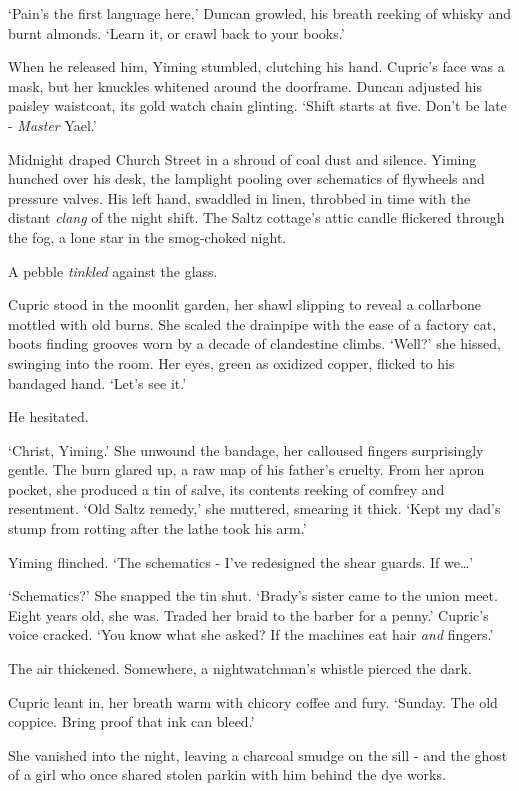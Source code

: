 `Pain's the first language here,' Duncan growled, his breath reeking of whisky and burnt almonds. `Learn it, or crawl back to your books.'

When he released him, Yiming stumbled, clutching his hand. Cupric's face was a mask, but her knuckles whitened around the doorframe. Duncan adjusted his paisley waistcoat, its gold watch chain glinting. `Shift starts at five. Don't be late - \textit{Master} Yael.'

Midnight draped Church Street in a shroud of coal dust and silence. Yiming hunched over his desk, the lamplight pooling over schematics of flywheels and pressure valves. His left hand, swaddled in linen, throbbed in time with the distant \textit{clang} of the night shift. The Saltz cottage's attic candle flickered through the fog, a lone star in the smog-choked night.

A pebble \textit{tinkled} against the glass.

Cupric stood in the moonlit garden, her shawl slipping to reveal a collarbone mottled with old burns. She scaled the drainpipe with the ease of a factory cat, boots finding grooves worn by a decade of clandestine climbs. `Well?' she hissed, swinging into the room. Her eyes, green as oxidized copper, flicked to his bandaged hand. `Let's see it.'

He hesitated.

`Christ, Yiming.' She unwound the bandage, her calloused fingers surprisingly gentle. The burn glared up, a raw map of his father's cruelty. From her apron pocket, she produced a tin of salve, its contents reeking of comfrey and resentment. `Old Saltz remedy,' she muttered, smearing it thick. `Kept my dad's stump from rotting after the lathe took his arm.'

Yiming flinched. `The schematics - I've redesigned the shear guards. If we\dots'

`Schematics?' She snapped the tin shut. `Brady's sister came to the union meet. Eight years old, she was. Traded her braid to the barber for a penny.' Cupric's voice cracked. `You know what she asked? If the machines eat hair \textit{and} fingers.'

The air thickened. Somewhere, a nightwatchman's whistle pierced the dark.

Cupric leant in, her breath warm with chicory coffee and fury. `Sunday. The old coppice. Bring proof that ink can bleed.'

She vanished into the night, leaving a charcoal smudge on the sill - and the ghost of a girl who once shared stolen parkin with him behind the dye works.

